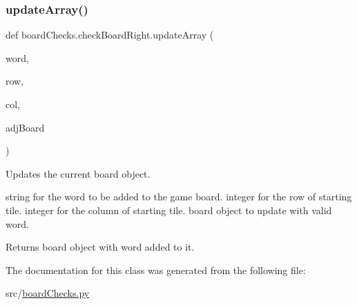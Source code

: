 \subsubsection{\texorpdfstring{update\+Array()}{updateArray()}}
{\footnotesize\ttfamily def board\+Checks.\+check\+Board\+Right.\+update\+Array (\begin{DoxyParamCaption}\item[{}]{word,  }\item[{}]{row,  }\item[{}]{col,  }\item[{}]{adj\+Board }\end{DoxyParamCaption})}



Updates the current board object. 

string for the word to be added to the game board.  integer for the row of starting tile.  integer for the column of starting tile.  board object to update with valid word. \begin{DoxyReturn}{Returns}
board object with word added to it. 
\end{DoxyReturn}


The documentation for this class was generated from the following file\+:\begin{DoxyCompactItemize}
\item 
src/\hyperlink{board_checks_8py}{board\+Checks.\+py}\end{DoxyCompactItemize}
